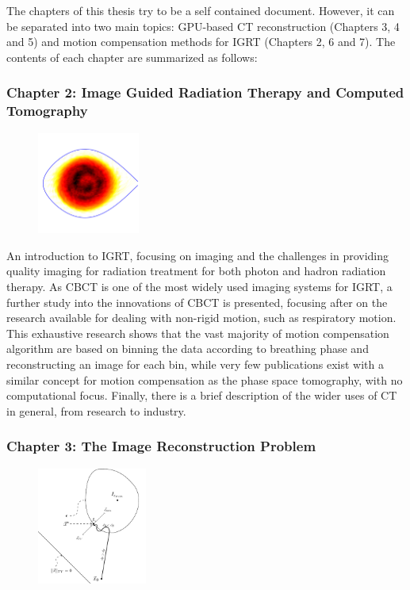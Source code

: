 The chapters of this thesis try to be a self contained document. However, it can be separated into two main topics: GPU-based CT reconstruction (Chapters 3, 4 and 5) and motion compensation methods for IGRT (Chapters 2, 6 and 7).  The contents of each chapter are summarized as follows:

\subsubsection{Chapter 2: Image Guided Radiation Therapy and Computed Tomography}


\begin{figure}
\centering
\includegraphics[width=0.30\textwidth]{StateOfArt/pst.png}
\end{figure}

An introduction to IGRT, focusing on imaging and the challenges in providing quality imaging for radiation treatment for both photon and hadron radiation therapy. As CBCT is one of the most widely used imaging systems for IGRT, a further study into the innovations of CBCT is presented, focusing after on the research available for dealing with non-rigid motion, such as respiratory motion. This exhaustive research shows that the vast majority of motion compensation algorithm are based on binning the data according to breathing phase and reconstructing an image for each bin, while very few publications exist with a similar concept for motion compensation as the phase space tomography, with no computational focus. Finally, there is a brief description of the wider uses of CT in general, from research to industry.

\vspace{40pt}
\subsubsection{Chapter 3: The Image Reconstruction Problem}

\begin{figure}
\centering
\includegraphics[width=0.32\textwidth]{RecAlgorithms/POCS.pdf}
\end{figure}

